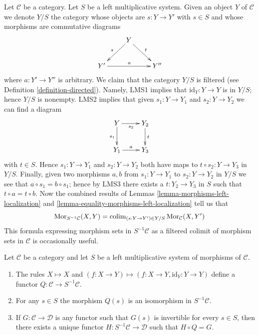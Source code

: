 \begin{remark}
\label{remark-left-localization-morphisms-colimit}
Let $\mathcal{C}$ be a category. Let $S$ be a left multiplicative system.
Given an object $Y$ of $\mathcal{C}$ we denote $Y/S$ the category whose
objects are $s : Y \to Y'$ with $s \in S$ and whose morphisms are
commutative diagrams
$$
\xymatrix{
& Y \ar[ld]_s \ar[rd]^t & \\
Y' \ar[rr]^a & & Y''
}
$$
where $a : Y' \to Y''$ is arbitrary. We claim that the category
$Y/S$ is filtered (see
Definition \ref{definition-directed}).
Namely, LMS1 implies that $\text{id}_Y : Y \to Y$
is in $Y/S$; hence $Y/S$ is nonempty. LMS2 implies that given
$s_1 : Y \to Y_1$ and $s_2 : Y \to Y_2$ we can find a diagram
$$
\xymatrix{
Y \ar[d]_{s_1} \ar[r]_{s_2} & Y_2 \ar[d]^t \\
Y_1 \ar[r]^a & Y_3
}
$$
with $t \in S$. Hence $s_1 : Y \to Y_1$ and $s_2 : Y \to Y_2$
both have maps to $t \circ s_2 : Y \to Y_3$ in $Y/S$. Finally, given
two morphisms $a, b$ from $s_1 : Y \to Y_1$ to $s_2 : Y \to Y_2$
in $Y/S$ we see that $a \circ s_1 = b \circ s_1$; hence by LMS3
there exists a $t : Y_2 \to Y_3$ in $S$ such that
$t \circ a = t \circ b$.
Now the combined results of
Lemmas \ref{lemma-morphisms-left-localization} and
\ref{lemma-equality-morphisms-left-localization}
tell us that
\begin{equation}
\label{equation-left-localization-morphisms-colimit}
\mathop{\mathrm{Mor}}\nolimits_{S^{-1}\mathcal{C}}(X, Y) =
\mathop{\mathrm{colim}}\nolimits_{(s : Y \to Y') \in Y/S} \mathop{\mathrm{Mor}}\nolimits_\mathcal{C}(X, Y')
\end{equation}
This formula expressing morphism sets in $S^{-1}\mathcal{C}$ as a filtered
colimit of morphism sets in $\mathcal{C}$ is occasionally useful.
\end{remark}

\begin{lemma}
\label{lemma-properties-left-localization}
Let $\mathcal{C}$ be a category and let $S$ be a left multiplicative
system of morphisms of $\mathcal{C}$.
\begin{enumerate}
\item The rules $X \mapsto X$ and
$(f : X \to Y) \mapsto (f : X \to Y, \text{id}_Y : Y \to Y)$
define a functor $Q : \mathcal{C} \to S^{-1}\mathcal{C}$.
\item For any $s \in S$ the morphism $Q(s)$ is an isomorphism in
$S^{-1}\mathcal{C}$.
\item If $G : \mathcal{C} \to \mathcal{D}$ is any functor such that
$G(s)$ is invertible for every $s \in S$, then there exists a
unique functor $H : S^{-1}\mathcal{C} \to \mathcal{D}$
such that $H \circ Q = G$.
\end{enumerate}
\end{lemma}

